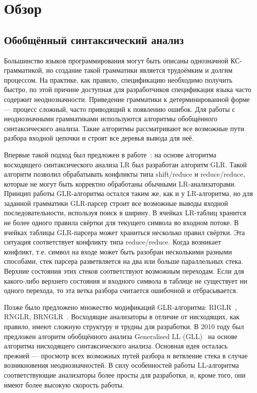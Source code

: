 \documentclass[14pt]{matmex-diploma}
\begin{document}
\section{Обзор}
\subsection{Обобщённый синтаксический анализ}
Большинство языков программирования могут быть описаны однозначной КС-грамматикой, но создание такой грамматики является трудоёмким и долгим процессом. На практике, как правило, спецификацию необходимо получить быстро, по этой причине доступная для разработчиков спецификация языка часто содержит неоднозначности. Приведение грамматики к детерминированной форме --- процесс сложный, часто приводящий к появлению ошибок. Для работы с неоднозначными грамматиками используются алгоритмы обобщённого синтаксического анализа. Такие алгоритмы рассматривают все возможные пути разбора входной цепочки и строят все деревья вывода для неё.

Впервые такой подход был предложен в работе~\cite{Tomita}: на основе алгоритма восходящего синтаксического анализа LR был разработан алгоритм GLR. Такой алгоритм позволил обрабатывать конфликты типа shift/reduce и reduce/reduce, которые не могут быть корректно обработаны обычными LR-анализаторами. Принцип работы GLR-алгоритма остался таким же, как и у LR-алгоритма, но для заданной грамматики GLR-парсер строит все возможные выводы входной последовательности, используя поиск в ширину. В ячейках LR-таблиц хранится не более одного правила свёртки для текущего символа во входном потоке. В ячейках таблицы GLR-парсера может храниться несколько правил свёртки. Эта ситуация соответствует конфликту типа reduce/reduce. Когда возникает конфликт, т.е. символ на входе может быть разобран несколькими разными способами, стек парсера разветвляется на два или больше параллельных стека. Верхние состояния этих стеков соответствуют возможным переходам. Если для какого-либо верхнего состояния и входного символа в таблице не существует ни одного перехода, то эта ветка разбора считается ошибочной и отбрасывается. 

Позже было предложено множество модификаций GLR-алгоритма: RIGLR~\cite{RIGLR}, RNGLR, BRNGLR~\cite{BRNGLR}. Восходящие анализаторы в отличие от нисходящих, как правило, имеют сложную структуру и трудны для разработки. В 2010 году был предложен алгоритм обобщённого анализа Generalised LL (GLL)~\cite{GLL} на основе алгоритма нисходящего синтаксического анализа. Основная идея осталась прежней --- просмотр всех возможных путей разбора и ветвление стека в случае возникновения неоднозначностей. В силу особенностей работы LL-алгоритма соответствующие анализаторы более просты для разработки, и, кроме того, они имеют более высокую скорость работы.
\end{document}
